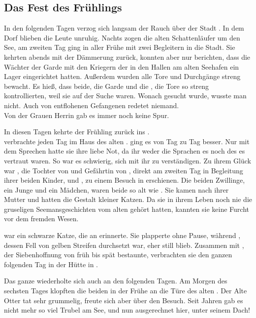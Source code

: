 \begin{Large}
\chapter{Das Fest des Frühlings}
In den folgenden Tagen verzog sich langsam der Rauch über der Stadt {\Tern}. In dem Dorf {\Berna} blieben die Leute unruhig. Nachts zogen die alten Schattenläufer um den See, am zweiten Tag ging in aller Frühe {\Nox} mit zwei Begleitern in die Stadt. Sie kehrten abends mit der Dämmerung zurück, konnten aber nur berichten, dass die Wächter der Garde mit den Kriegern der {\Bangiri} in den Hallen am alten Seehafen ein Lager eingerichtet hatten. Außerdem wurden alle Tore und Durchgänge streng bewacht. Es hieß, dass beide, die Garde und die {\Bangiri}, die Tore so streng kontrollierten, weil sie auf der Suche waren. Wonach gesucht wurde, wusste man nicht. Auch von entflohenen Gefangenen redetet niemand.\\
Von der Grauen Herrin gab es immer noch keine Spur. 

In diesen Tagen kehrte der Frühling zurück ins {\Enland}.\\
{\Salbana} verbrachte jeden Tag im Haus des alten {\Marn}. {\Sepa} ging es von Tag zu Tag besser. Nur mit dem Sprechen hatte sie ihre liebe Not, da ihr weder die Sprachen {\Rhinland}es noch des {\Enland}es vertraut waren. So war es schwierig, sich mit ihr zu verständigen. Zu ihrem Glück war {\Mena}, die Tochter von {\Eno} und Gefährtin von {\Nox}, direkt am zweiten Tag in Begleitung ihrer beiden Kinder, {\Enno} und {\Ena}, zu einem Besuch in {\AltBerna} erschienen. Die beiden Zwillinge, ein Junge und ein Mädchen, waren beide so alt wie {\Sepa}. Sie kamen nach ihrer Mutter und hatten die Gestalt kleiner Katzen. Da sie in ihrem Leben noch nie die gruseligen Seemansgeschichten vom alten {\Marn} gehört hatten, kannten sie keine Furcht vor dem fremden Wesen.

{\Ena} war ein schwarze Katze, die an {\Eno} erinnerte. Sie plapperte ohne Pause, während {\Enno}, dessen Fell von gelben Streifen durchsetzt war, eher still blieb. Zusammen mit {\Piedo}, der Siebenhoffnung von früh bis spät bestaunte, verbrachten sie den ganzen folgenden Tag in der Hütte in {\AltBerna}. 

Das ganze wiederholte sich auch an den folgenden Tagen. Am Morgen des sechsten Tages klopften die beiden in der Frühe an die Türe des alten {\Marn}. Der Alte Otter {\Marn} tat sehr grummelig, freute sich aber über den Besuch. Seit Jahren gab es nicht mehr so viel Trubel am See, und nun ausgerechnet hier, unter seinem Dach!


\end{Large}
